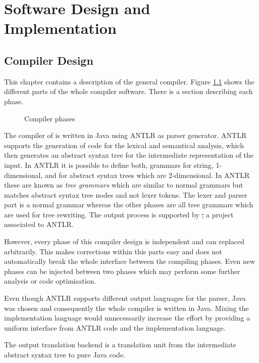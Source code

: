 \chapter{Software Design and Implementation}

\section{Compiler Design}
This chapter contains a description of the general compiler. Figure
\ref{fig:compilerPhase} shows the different parts of the whole compiler
software. There is a section describing each phase.

\begin{figure}[ht]
	\centerline{}
	\caption{Compiler phases}
	\label{fig:compilerPhase}
\end{figure}

The compiler of \ooplss is written in Java using
ANTLR as parser generator. ANTLR supports the generation of code for the lexical
and semantical analysis, which then generates an abstract syntax tree for
the intermediate representation of the input. In ANTLR it is possible to
define both, grammars for string, 1-dimensional, and for
abstract syntax trees which are 2-dimensional. In ANTLR these are known
as \emph{tree grammars} which are similar to normal grammars but matches
abstract syntax tree nodes and not lexer tokens. The lexer and parser
part is a normal grammar whereas the other phases are all tree grammars
which are used for tree rewriting.
The output process is supported by
\st, a project associated to ANTLR.

However, every phase of this compiler design is independent and can 
replaced arbitrarily. This makes corrections within this parts easy and
does not automatically break the whole interface between the compiling
phases. Even new phases can be injected between two phases which may 
perform some further analysis or code optimisation.

Even though ANTLR supports different output languages for the parser, Java was
chosen and consequently the whole compiler is written in Java. Mixing
the implementation language would unnecessarily increase the effort
by providing a uniform interface from ANTLR code and the implementation
language.

The output translation backend is a translation unit from the
intermediate abstract syntax tree to pure Java code.


